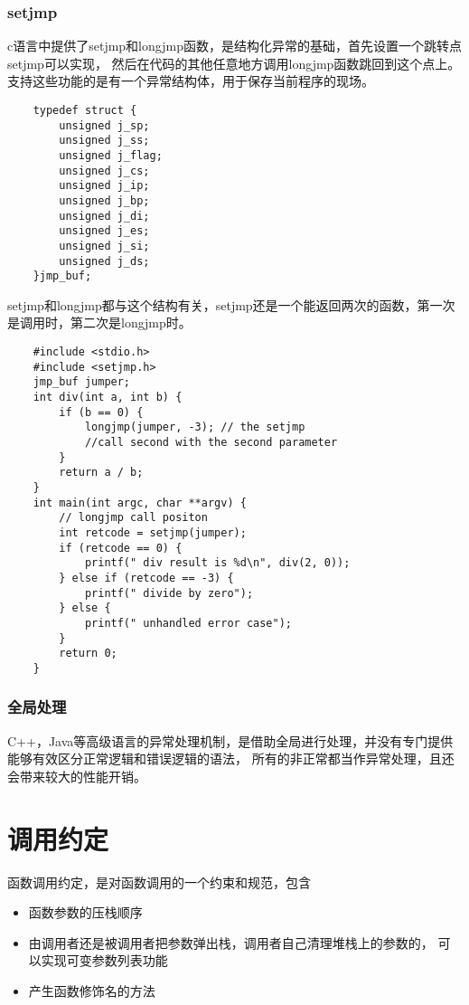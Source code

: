 \subsubsection{setjmp}
c语言中提供了setjmp和longjmp函数，是结构化异常的基础，首先设置一个跳转点setjmp可以实现，
然后在代码的其他任意地方调用longjmp函数跳回到这个点上。
\newline
支持这些功能的是有一个异常结构体，用于保存当前程序的现场。
\begin{lstlisting}
    typedef struct {
        unsigned j_sp;
        unsigned j_ss;
        unsigned j_flag;
        unsigned j_cs;
        unsigned j_ip;
        unsigned j_bp;
        unsigned j_di;
        unsigned j_es;
        unsigned j_si;
        unsigned j_ds;
    }jmp_buf;
\end{lstlisting}
setjmp和longjmp都与这个结构有关，setjmp还是一个能返回两次的函数，第一次是调用时，第二次是longjmp时。
\begin{lstlisting}
    #include <stdio.h>
    #include <setjmp.h>
    jmp_buf jumper;
    int div(int a, int b) {
        if (b == 0) {
            longjmp(jumper, -3); // the setjmp 
            //call second with the second parameter
        }
        return a / b;
    }
    int main(int argc, char **argv) {
        // longjmp call positon 
        int retcode = setjmp(jumper); 
        if (retcode == 0) {
            printf(" div result is %d\n", div(2, 0));
        } else if (retcode == -3) {
            printf(" divide by zero");
        } else {
            printf(" unhandled error case");
        }
        return 0;
    }
\end{lstlisting}

\subsubsection{全局处理}
C++，Java等高级语言的异常处理机制，是借助全局进行处理，并没有专门提供能够有效区分正常逻辑和错误逻辑的语法，
所有的非正常都当作异常处理，且还会带来较大的性能开销。

\section{调用约定}
函数调用约定，是对函数调用的一个约束和规范，包含
\begin{itemize}
    \item {函数参数的压栈顺序}
    \item {由调用者还是被调用者把参数弹出栈，调用者自己清理堆栈上的参数的，
    可以实现可变参数列表功能}
    \item {产生函数修饰名的方法}
\end{itemize}

